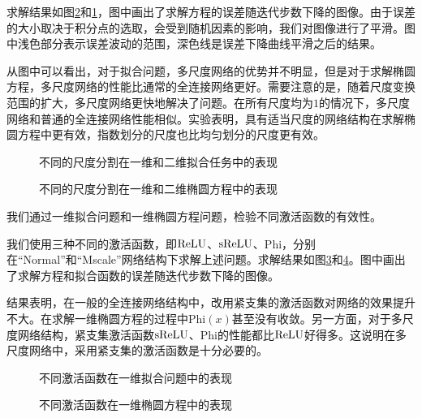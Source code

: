 求解结果如图\ref{e3-2}和\ref{e3-1}，图中画出了求解方程的误差随迭代步数下降的图像。由于误差的大小取决于积分点的选取，会受到随机因素的影响，我们对图像进行了平滑。图中浅色部分表示误差波动的范围，深色线是误差下降曲线平滑之后的结果。

从图中可以看出，对于拟合问题，多尺度网络的优势并不明显，但是对于求解椭圆方程，多尺度网络的性能比通常的全连接网络更好。需要注意的是，随着尺度变换范围的扩大，多尺度网络更快地解决了问题。在所有尺度均为$1$的情况下，多尺度网络和普通的全连接网络性能相似。实验表明，具有适当尺度的网络结构在求解椭圆方程中更有效，指数划分的尺度也比均匀划分的尺度更有效。

\begin{figure}[htbp]
\centering
{}
\caption{不同的尺度分割在一维和二维拟合任务中的表现}
\label{e3-1}
\end{figure}

\begin{figure}[htbp]
\centering
{}
\caption{不同的尺度分割在一维和二维椭圆方程中的表现}
\label{e3-2}
\end{figure}


我们通过一维拟合问题和一维椭圆方程问题，检验不同激活函数的有效性。

我们使用三种不同的激活函数，即${\rm ReLU}$、${\rm sReLU}$、$\mathrm{Phi}$，分别在“Normal”和“Mscale”网络结构下求解上述问题。求解结果如图\ref{e1-1}和\ref{e1-2}。图中画出了求解方程和拟合函数的误差随迭代步数下降的图像。

结果表明，在一般的全连接网络结构中，改用紧支集的激活函数对网络的效果提升不大。在求解一维椭圆方程的过程中$\mathrm{Phi}(x)$甚至没有收敛。另一方面，对于多尺度网络结构，紧支集激活函数${\rm sReLU}$、$\mathrm{Phi}$的性能都比${\rm ReLU}$好得多。这说明在多尺度网络中，采用紧支集的激活函数是十分必要的。

\begin{figure}[htbp]
\centering
{}
\caption{不同激活函数在一维拟合问题中的表现}
\label{e1-1}
\end{figure}

\begin{figure}[htbp]
\centering
{}
\caption{不同激活函数在一维椭圆方程中的表现}
\label{e1-2}
\end{figure}

